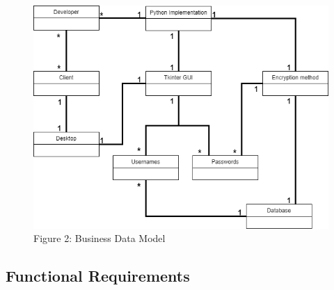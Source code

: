 \documentclass[12pt, titlepage]{article}
\begin{document}
\begin{figure}[h]
\includegraphics{Images/BusinessModel.png}
\caption{Figure 2: Business Data Model}
\end{figure}

\subsection{Functional Requirements}
\end{document}
